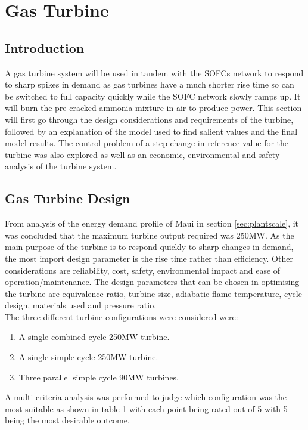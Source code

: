 \documentclass[11pt, oneside]{article}
\begin{document}
\section{Gas Turbine}

\subsection{Introduction}\label{sec:intro}
A gas turbine system will be used in tandem with the SOFCs network to respond to sharp spikes in demand as gas turbines have a much shorter rise time so can be switched to full capacity quickly while the SOFC network slowly ramps up. It will burn the pre-cracked ammonia mixture in air to produce power. This section will first go through the design considerations and requirements of the turbine, followed by an explanation of the model used to find salient values and the final model results. The control problem of a step change in reference value for the turbine was also explored as well as an economic, environmental and safety analysis of the turbine system.

\subsection{Gas Turbine Design}
From analysis of the energy demand profile of Maui in section \ref{sec:plantscale}, it was concluded that the maximum turbine output required was 250MW. As the main purpose of the turbine is to respond quickly to sharp changes in demand, the most import design parameter is the rise time rather than efficiency. Other considerations are reliability, cost, safety, environmental impact and ease of operation/maintenance. The design parameters that can be chosen in optimising the turbine are equivalence ratio, turbine size, adiabatic flame temperature, cycle design, materials used and pressure ratio.\\The three different turbine configurations were considered were:
\begin {enumerate}
\item A single combined cycle 250MW turbine.
\item A single simple cycle 250MW turbine. 
\item Three parallel simple cycle 90MW turbines. 
\end {enumerate}
A multi-criteria analysis was performed to judge which configuration was the most suitable as shown in table 1 with each point being rated out of 5 with 5 being the most desirable outcome. 
\end{document}
